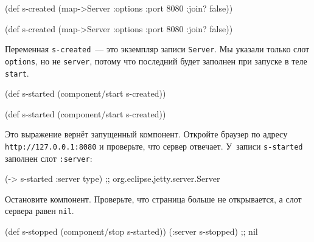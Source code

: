 \ifnarrow

\begin{english}
  \begin{clojure}
(def s-created
  (map->Server
    {:options {:port 8080
               :join? false}}))
  \end{clojure}
\end{english}

\else

\begin{english}
  \begin{clojure}
(def s-created
  (map->Server {:options {:port 8080 :join? false}}))
  \end{clojure}
\end{english}

\fi

Переменная \verb|s-created|~--- это экземпляр записи \verb|Server|. Мы указали
только слот \verb|options|, но не \verb|server|, потому что последний будет
заполнен при запуске в теле \verb|start|.

\ifnarrow

\begin{english}
  \begin{clojure}
(def s-started
  (component/start s-created))
  \end{clojure}
\end{english}

\else

\begin{english}
  \begin{clojure}
(def s-started (component/start s-created))
  \end{clojure}
\end{english}

\fi

\mnoindent
Это выражение вернёт запущенный компонент. Откройте браузер по адресу
\texttt{http://127.0.0.1\-:8080} и проверьте, что сервер отвечает. У~записи
\verb|s-started| заполнен слот \verb|:server|:

\begin{english}
  \begin{clojure}
(-> s-started :server type)
;; org.eclipse.jetty.server.Server
  \end{clojure}
\end{english}

Остановите компонент. Проверьте, что страница больше не открывается, а слот
сервера равен \verb|nil|.

\ifnarrow

\begin{english}
  \begin{clojure}
(def s-stopped
  (component/stop s-started))
(:server s-stopped) ;; nil
  \end{clojure}
\end{english}

